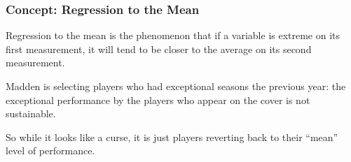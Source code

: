 \documentclass[handout]{beamer}
\newcommand{\blue}[1]{\textcolor{blue2}{#1}}
\begin{document}
\begin{frame}[fragile]
\frametitle{Concept: Regression to the Mean}

%
%
\blue{Regression to the mean} is the phenomenon that if a variable is extreme on its first measurement, it will tend to be closer to the average on its second measurement.
\vspace{0.5cm}

\pause Madden is selecting players who had \blue{exceptional} seasons the previous year: the exceptional performance by the players who appear on the cover is \blue{not sustainable}.  

\vspace{0.5cm}

\pause So while it looks like a curse, it is just players reverting back to their ``mean'' level of performance.  

\end{frame}


%
%
\end{document}
